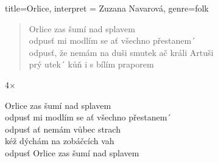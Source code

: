\begin{song}{title={Orlice}, interpret = {Zuzana Navarová}, genre={folk}}
\begin{verse}
Orlice zas šumí nad splavem  \\
odpusť mi modlím se ať všechno přestanem´  \\
odpusť, že nemám na duši smutek ač králi Artuši  \\
prý utek´ kůň i s bílím praporem 
\end{verse}

\begin{interlude}
4$\times$ \leftrepeat \,     \, \rightrepeat \quad {} 
\end{interlude}

\begin{chorus}
Orlice zas šumí nad splavem  \\
odpusť mi modlím se ať všechno přestanem´  \\
odpusť ať nemám vůbec strach  \\
kéž dýchám na zobáčcích vah  \\
odpusť Orlice zas šumí nad splavem 
\end{chorus}


\end{song}